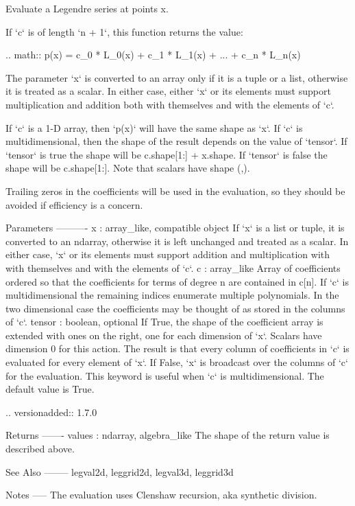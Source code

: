 \begin{DoxyVerb}Evaluate a Legendre series at points x.

If `c` is of length `n + 1`, this function returns the value:

.. math:: p(x) = c_0 * L_0(x) + c_1 * L_1(x) + ... + c_n * L_n(x)

The parameter `x` is converted to an array only if it is a tuple or a
list, otherwise it is treated as a scalar. In either case, either `x`
or its elements must support multiplication and addition both with
themselves and with the elements of `c`.

If `c` is a 1-D array, then `p(x)` will have the same shape as `x`.  If
`c` is multidimensional, then the shape of the result depends on the
value of `tensor`. If `tensor` is true the shape will be c.shape[1:] +
x.shape. If `tensor` is false the shape will be c.shape[1:]. Note that
scalars have shape (,).

Trailing zeros in the coefficients will be used in the evaluation, so
they should be avoided if efficiency is a concern.

Parameters
----------
x : array_like, compatible object
    If `x` is a list or tuple, it is converted to an ndarray, otherwise
    it is left unchanged and treated as a scalar. In either case, `x`
    or its elements must support addition and multiplication with
    with themselves and with the elements of `c`.
c : array_like
    Array of coefficients ordered so that the coefficients for terms of
    degree n are contained in c[n]. If `c` is multidimensional the
    remaining indices enumerate multiple polynomials. In the two
    dimensional case the coefficients may be thought of as stored in
    the columns of `c`.
tensor : boolean, optional
    If True, the shape of the coefficient array is extended with ones
    on the right, one for each dimension of `x`. Scalars have dimension 0
    for this action. The result is that every column of coefficients in
    `c` is evaluated for every element of `x`. If False, `x` is broadcast
    over the columns of `c` for the evaluation.  This keyword is useful
    when `c` is multidimensional. The default value is True.

    .. versionadded:: 1.7.0

Returns
-------
values : ndarray, algebra_like
    The shape of the return value is described above.

See Also
--------
legval2d, leggrid2d, legval3d, leggrid3d

Notes
-----
The evaluation uses Clenshaw recursion, aka synthetic division.\end{DoxyVerb}
 \mbox{\label{namespacenumpy_1_1polynomial_1_1legendre_aa36dea805de5eadac0e36dab6ef89be9}} 
